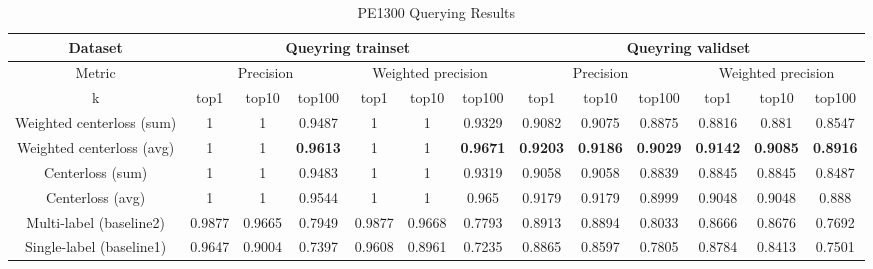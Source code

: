 \begin{table*}[!htb]%
\caption{PE1300 Querying Results}
\label{tab:pe_result}
\begin{minipage}{\textwidth}
\begin{center}
\begin{tabular}{|c|c|c|c|c|c|c|c|c|c|c|c|c|}
\hline
Dataset             & \multicolumn{6}{c|}{Queyring trainset}                      & \multicolumn{6}{c|}{Queyring validset}                      \\ \hline
Metric              & \multicolumn{3}{c|}{Precision}  & \multicolumn{3}{c|}{Weighted precision} & \multicolumn{3}{c|}{Precision}  & \multicolumn{3}{c|}{Weighted precision} \\ \hline
k              & top1   & top10  & top100 & top1      & top10     & top100   & top1   & top10  & top100 & top1      & top10     & top100   \\ \hline
Weighted centerloss (sum)  & 1      & 1      & 0.9487 & 1         & 1         & 0.9329   & 0.9082 & 0.9075 & 0.8875 & 0.8816    & 0.881     & 0.8547   \\ \hline
Weighted centerloss (avg) & 1      & 1      & \textbf{0.9613} & 1         & 1         & \textbf{0.9671}   & \textbf{0.9203} & \textbf{0.9186} & \textbf{0.9029 }& \textbf{0.9142}    &\textbf{ 0.9085}    & \textbf{0.8916}   \\ \hline
Centerloss (sum)         & 1      & 1      & 0.9483 & 1         & 1         & 0.9319   & 0.9058 & 0.9058 & 0.8839 & 0.8845    & 0.8845    & 0.8487   \\ \hline
Centerloss (avg)        & 1      & 1      & 0.9544 & 1         & 1         & 0.965    & 0.9179 & 0.9179 & 0.8999 & 0.9048    & 0.9048    & 0.888    \\ \hline
Multi-label (baseline2)               & 0.9877 & 0.9665 & 0.7949 & 0.9877    & 0.9668    & 0.7793   & 0.8913 & 0.8894 & 0.8033 & 0.8666    & 0.8676    & 0.7692   \\ \hline
Single-label (baseline1)              & 0.9647 & 0.9004 & 0.7397 & 0.9608    & 0.8961    & 0.7235   & 0.8865 & 0.8597 & 0.7805 & 0.8784    & 0.8413    & 0.7501   \\ \hline
\end{tabular}
\end{center}
\bigskip\centering

\end{minipage}
\end{table*}%


